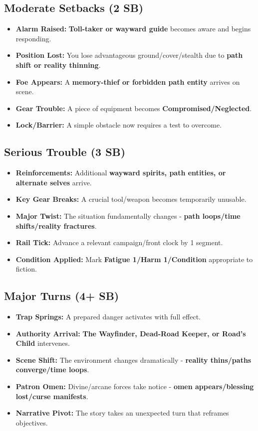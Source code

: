 \subsection*{Moderate Setbacks (2 SB)}
\begin{itemize}
\item \textbf{Alarm Raised:} \textbf{Toll-taker or wayward guide} becomes aware and begins responding.
\item \textbf{Position Lost:} You lose advantageous ground/cover/stealth due to \textbf{path shift or reality thinning}.
\item \textbf{Foe Appears:} A \textbf{memory-thief or forbidden path entity} arrives on scene.
\item \textbf{Gear Trouble:} A piece of equipment becomes \textbf{Compromised/Neglected}.
\item \textbf{Lock/Barrier:} A simple obstacle now requires a test to overcome.
\end{itemize}

\subsection*{Serious Trouble (3 SB)}
\begin{itemize}
\item \textbf{Reinforcements:} Additional \textbf{wayward spirits, path entities, or alternate selves} arrive.
\item \textbf{Key Gear Breaks:} A crucial tool/weapon becomes temporarily unusable.
\item \textbf{Major Twist:} The situation fundamentally changes - \textbf{path loops/time shifts/reality fractures}.
\item \textbf{Rail Tick:} Advance a relevant campaign/front clock by 1 segment.
\item \textbf{Condition Applied:} Mark \textbf{Fatigue 1/Harm 1/Condition} appropriate to fiction.
\end{itemize}

\subsection*{Major Turns (4+ SB)}
\begin{itemize}
\item \textbf{Trap Springs:} A prepared danger activates with full effect.
\item \textbf{Authority Arrival:} \textbf{The Wayfinder, Dead-Road Keeper, or Road's Child} intervenes.
\item \textbf{Scene Shift:} The environment changes dramatically - \textbf{reality thins/paths converge/time loops}.
\item \textbf{Patron Omen:} Divine/arcane forces take notice - \textbf{omen appears/blessing lost/curse manifests}.
\item \textbf{Narrative Pivot:} The story takes an unexpected turn that reframes objectives.
\end{itemize}

